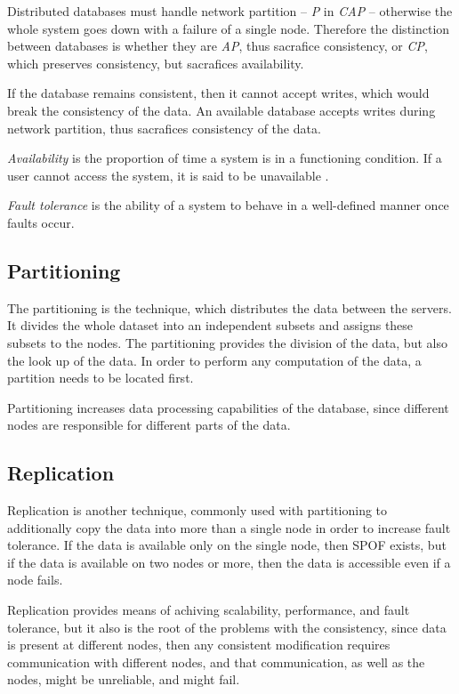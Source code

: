 Distributed databases must handle network partition -- \emph{P} in \emph{CAP} -- otherwise the whole system goes down with a failure of a single node. Therefore the distinction between databases is whether they are \emph{AP}, thus sacrafice consistency, or \emph{CP}, which preserves consistency, but sacrafices availability.

If the database remains consistent, then it cannot accept writes, which would break the consistency of the data. An available database accepts writes during network partition, thus sacrafices consistency of the data.

\begin{definition}
	\label{def:availability}
	\emph{Availability} is the proportion of time a system is in a functioning condition. If a user cannot access the system, it is said to be unavailable \cite{DistributeSystemsForFunAndProfit}.	
\end{definition}


\begin{definition}
\label{def:fault-tolerance}
\emph{Fault tolerance} is the ability of a system to behave in a well-defined manner once faults occur. 
\end{definition}

\subsection{Partitioning}
The partitioning is the technique, which distributes the data between the servers. 
It divides the whole dataset into an independent subsets and assigns these subsets to the nodes. The partitioning provides the division of the data, but also the look up of the data. In order to perform any computation of the data, a partition needs to be located first. 

Partitioning increases data processing capabilities of the database, since different nodes are responsible for different parts of the data. 

\subsection{Replication}
Replication is another technique, commonly used with partitioning to additionally copy the data into more than a single node in order to increase fault tolerance. If the data is available only on the single node, then SPOF exists, but if the data is available on two nodes or more, then the data is accessible even if a node fails.

Replication provides means of achiving scalability, performance, and fault tolerance, but it also is the root of the problems with the consistency, since data is present at different nodes, then any consistent modification requires communication with different nodes, and that communication, as well as the nodes, might be unreliable, and might fail.